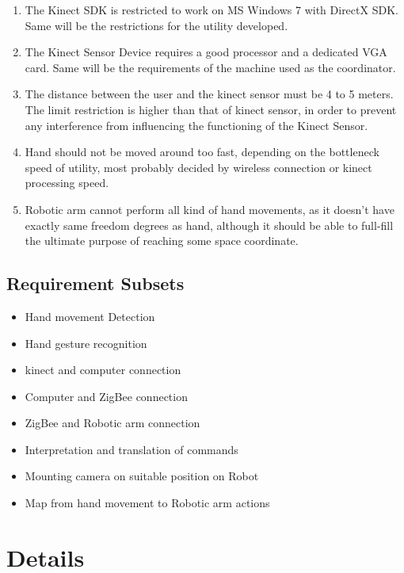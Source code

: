 \documentclass[a4wide]{scrreprt}
\begin{document}
\begin{enumerate}
\item The Kinect SDK is restricted to work on MS Windows 7 with DirectX SDK. Same will be the restrictions for the utility developed.
\item The Kinect Sensor Device requires a good processor and a dedicated VGA card. Same will be the requirements of the machine used as the coordinator.
\item The distance between the user and the kinect sensor must be 4 to 5 meters. The limit restriction is higher than that of kinect sensor, in order to prevent any interference from influencing the functioning of the Kinect Sensor. 
\item Hand should not be moved around too fast, depending on the bottleneck speed of utility, most probably decided by wireless connection or kinect processing speed.
\item Robotic arm cannot perform all kind of hand movements, as it doesn't have exactly same freedom degrees as hand, although it should be able to full-fill the ultimate purpose of reaching some space coordinate.
\end{enumerate}

\section{Requirement Subsets}

\begin{itemize}
\item Hand movement Detection
\item Hand gesture recognition
\item kinect and computer connection
\item Computer and ZigBee connection
\item ZigBee and Robotic arm connection
\item Interpretation and translation of commands
\item Mounting camera on suitable position on Robot
\item Map from hand movement to Robotic arm actions
\end{itemize}

\chapter{Details}
\end{document}
